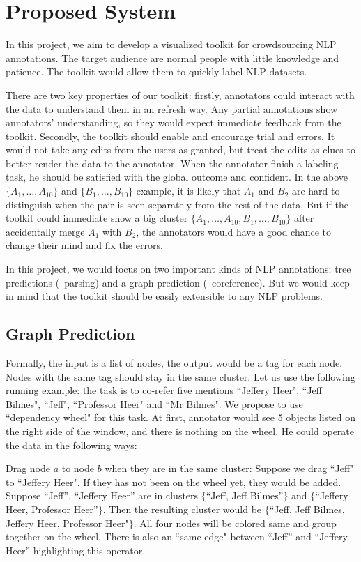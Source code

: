 \section{Proposed System}

In this project, we aim to develop a visualized toolkit for crowdsourcing NLP annotations. The target audience are normal people with little knowledge and patience. The toolkit would allow them to quickly label NLP datasets.

There are two key properties of our toolkit: firstly, annotators could interact with the data to understand them in an refresh way. Any partial annotations show annotators' understanding, so they would expect immediate feedback from the toolkit. Secondly, the toolkit should enable and encourage trial and errors. It would not take any edits from the users as granted, but treat the edits as clues to better render the data to the annotator. When the annotator finish a labeling task, he should be satisfied with the global outcome and confident. In the above $\{A_1,\ldots,A_{10}\}$ and $\{B_1,\ldots,B_{10}\}$ example, it is likely that $A_1$ and $B_2$ are hard to distinguish when the pair is seen separately from the rest of the data. But if the toolkit could immediate show a big cluster $\{A_1,\ldots,A_{10}, B_1,\ldots,B_{10}\}$ after accidentally merge $A_1$ with $B_2$, the annotators would have a good chance to change their mind and fix the errors. 

 In this project, we would focus on two important kinds of NLP annotations: tree predictions (\eg\  parsing) and a graph prediction (\eg\ coreference). But we would keep in mind that the toolkit should be easily extensible to any NLP problems. 

\subsection{Graph Prediction}
Formally, the input is a list of nodes, the output would be a tag for each node. Nodes with the same tag should stay in the same cluster. Let us use the following running example: the task is to co-refer five mentions ``Jeffery Heer", ``Jeff Bilmes", ``Jeff", ``Professor Heer" and ``Mr Bilmes". We propose to use ``dependency wheel" for this task. At first, annotator would see 5 objects listed on the right side of the window, and there is nothing on the wheel. He could operate the data in the following ways:

Drag node $a$ to node $b$ when they are in the same cluster: Suppose we drag ``Jeff" to ``Jeffery Heer". If they has not been on the wheel yet, they would be added. Suppose ``Jeff'', ``Jeffery Heer'' are in clusters $\{$``Jeff, Jeff Bilmes''$\}$ and $\{$``Jeffery Heer, Professor Heer''$\}$. Then the resulting cluster would be $\{$``Jeff, Jeff Bilmes, Jeffery Heer, Professor Heer"$\}$. All four nodes will be colored same and group together on the wheel. There is also an ``same edge" between ``Jeff'' and ``Jeffery Heer'' highlighting this operator. 

